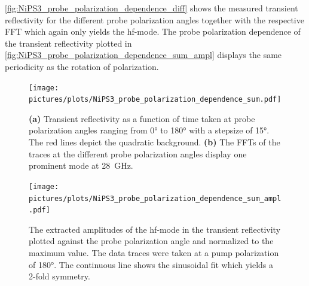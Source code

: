 \FloatBarrier
\autoref{fig:NiPS3_probe_polarization_dependence_diff} shows the measured transient reflectivity for the different probe polarization angles together with the respective FFT which again only yields the hf-mode.
The probe polarization dependence of the transient reflectivity plotted in \autoref{fig:NiPS3_probe_polarization_dependence_sum_ampl} displays the same periodicity as the rotation of polarization.
\begin{figure}[hbt!]
    \centering
    \texttt{[image: pictures/plots/NiPS3\_probe\_polarization\_dependence\_sum.pdf]} \vspace{-0.3cm}
    \caption{\textbf{(a)} Transient reflectivity as a function of time taken at probe polarization angles ranging from 0° to 180° with a stepsize of 15°. The red lines depict the quadratic background. \textbf{(b)} The FFTs of the traces at the different probe polarization angles display one prominent mode at \qty{28}{GHz}.}
    \label{fig:NiPS3_probe_polarization_dependence_sum}
\end{figure}
\begin{figure}[hbt!]
    \centering  
    \texttt{[image: pictures/plots/NiPS3\_probe\_polarization\_dependence\_sum\_ampl.pdf]} \vspace{-0.3cm}
    \caption{The extracted amplitudes of the hf-mode in the transient reflectivity plotted against the probe polarization angle and normalized to the maximum value. The data traces were taken at a pump polarization of 180°. The continuous line shows the sinusoidal fit which yields a 2-fold symmetry.}
    \label{fig:NiPS3_probe_polarization_dependence_sum_ampl}
\end{figure}
\FloatBarrier

